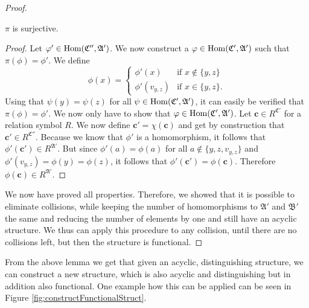 \begin{proof}
	\begin{claim}
		$\pi$ is surjective.
	\end{claim}
	\begin{proof}
		Let $\varphi'\in\operatorname{Hom}(\mathfrak C'',\mathfrak A')$.
		We now construct a $\varphi\in\operatorname{Hom}(\mathfrak C',\mathfrak A')$ such that $\pi(\phi)=\phi'$.
		We define
		$$
		\phi(x)=
		\begin{cases}
			\phi'(x) & \text{if } x \notin \{y,z\} \\
			\phi'(v_{y,z}) & \text{if } x \in \{y,z\}.
		\end{cases}
		$$
		Using that $\psi(y)=\psi(z)$ for all $\psi\in\operatorname{Hom}(\mathfrak C',\mathfrak A')$, it can easily be verified that $\pi(\phi)=\phi'$.
		We now only have to show that $\varphi\in\operatorname{Hom}(\mathfrak C',\mathfrak A')$. 
		Let $\mathbf c\in R^{\mathfrak C'}$ for a relation symbol $R$.
		We now define $\mathbf c'= \chi(\mathbf c)$ and get by construction that $\mathbf c'\in R^{\mathfrak C''}$.
		Because we know that $\phi'$ is a homomorphism, it follows that $\phi'(\mathbf c')\in R^{\mathfrak A'}$.
		But since $\phi'(a)=\phi(a)$ for all $a\notin \{y,z,v_{y,z}\}$ and $\phi'(v_{y,z})=\phi(y)=\phi(z)$, it follows that $\phi'(\mathbf c')=\phi(\mathbf c)$.
		Therefore $\phi(\mathbf c)\in R^{\mathfrak A'}$.
	\end{proof}
	
	We now have proved all properties.
	Therefore, we showed that it is possible to eliminate collisions, while keeping the number of homomorphisms to $\mathfrak A'$ and $\mathfrak B'$ the same and reducing the number of elements by one and still have an acyclic structure.
	We thus can apply this procedure to any collision, until there are no collisions left, but then the structure is functional.
\end{proof}

From the above lemma we get that given an acyclic, distinguishing structure, we can construct a new structure, which is also acyclic and distinguishing but in addition also functional.
One example how this can be applied can be seen in Figure \ref{fig:constructFunctionalStruct}.

